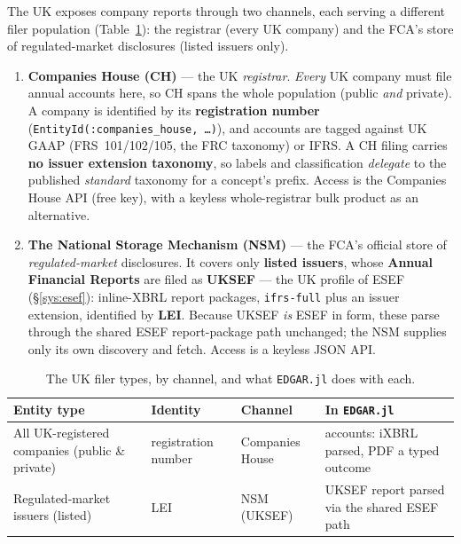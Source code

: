 \documentclass[11pt,a4paper]{report}
\begin{document}
The UK exposes company reports through two channels, each serving a different filer population
(Table~\ref{tab:uk-entities}): the registrar (every UK company) and the FCA's store of regulated-market
disclosures (listed issuers only).

\begin{enumerate}
  \item[\textbf{(a)}] \textbf{Companies House (CH)} --- the UK \emph{registrar}. \emph{Every} UK
    company must file annual accounts here, so CH spans the whole population (public \emph{and}
    private). A company is identified by its \textbf{registration number}
    (\texttt{EntityId(:companies\_house,\ \ldots)}), and accounts are tagged against UK GAAP
    (FRS~101/102/105, the FRC taxonomy) or IFRS. A CH filing carries \textbf{no issuer extension
    taxonomy}, so labels and classification \emph{delegate} to the published \emph{standard} taxonomy
    for a concept's prefix. Access is the Companies House API (free key), with a keyless
    whole-registrar bulk product as an alternative.

  \item[\textbf{(b)}] \textbf{The National Storage Mechanism (NSM)} --- the FCA's official store of
    \emph{regulated-market} disclosures. It covers only \textbf{listed issuers}, whose
    \textbf{Annual Financial Reports} are filed as \textbf{UKSEF} --- the UK profile of ESEF
    (\S\ref{sys:esef}): inline-XBRL report packages, \texttt{ifrs-full} plus an issuer extension,
    identified by \textbf{LEI}. Because UKSEF \emph{is} ESEF in form, these parse through the shared
    ESEF report-package path unchanged; the NSM supplies only its own discovery and fetch. Access is a
    keyless JSON API.
\end{enumerate}

\begin{table}[h]
\centering
\small
\caption{The UK filer types, by channel, and what \texttt{EDGAR.jl} does with each.}
\label{tab:uk-entities}
\begin{tabular}{@{}p{}p{}p{}p{}@{}}
\toprule
\textbf{Entity type} & \textbf{Identity} & \textbf{Channel} & \textbf{In \texttt{EDGAR.jl}} \\
\midrule
All UK-registered companies (public \& private) & registration number & Companies House & accounts: iXBRL parsed, PDF a typed outcome \\
Regulated-market issuers (listed) & LEI & NSM (UKSEF) & UKSEF report parsed via the shared ESEF path \\
\bottomrule
\end{tabular}
\end{table}
\end{document}
